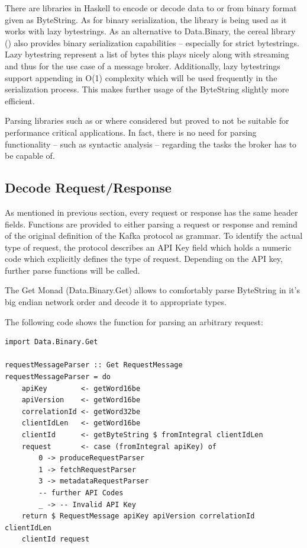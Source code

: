 There are libraries in Haskell to encode or decode data to or from binary
format given as ByteString. As for binary serialization, the
library is being used as it works with lazy bytestrings. As an alternative to
Data.Binary, the cereal library
()
also provides binary serialization capabilities -- especially for strict
bytestrings. Lazy bytestring represent a list of bytes this plays nicely along
with streaming and thus for the use case of a message broker. Additionally,
lazy bytestrings support appending in O(1) complexity which will be used
frequently in the serialization process. This makes further usage of the
ByteString slightly more efficient.

Parsing libraries such as
 or
 where considered but
proved to not be suitable for performance critical applications. In fact, there
is no need for parsing functionality -- such as syntactic analysis -- regarding
the tasks the broker has to be capable of. 

\subsection{Decode Request/Response}

As mentioned in previous section, every request or response has the same header
fields. Functions are provided to either parsing a request or response and
remind of the original definition of the Kafka protocol as grammar. To identify
the actual type of request, the protocol describes an API Key field which holds
a numeric code which explicitly defines the type of request. Depending on the
API key, further parse functions will be called. 

The Get Monad (Data.Binary.Get) allows to comfortably parse ByteString in
it's big endian network order and decode it to appropriate types.

The following code shows the function for parsing an arbitrary request:

\begin{lstlisting}
import Data.Binary.Get

requestMessageParser :: Get RequestMessage 
requestMessageParser = do 
    apiKey        <- getWord16be
    apiVersion    <- getWord16be
    correlationId <- getWord32be
    clientIdLen   <- getWord16be
    clientId      <- getByteString $ fromIntegral clientIdLen
    request       <- case (fromIntegral apiKey) of
        0 -> produceRequestParser
        1 -> fetchRequestParser
        3 -> metadataRequestParser
        -- further API Codes 
        _ -> -- Invalid API Key 
    return $ RequestMessage apiKey apiVersion correlationId clientIdLen
    clientId request
\end{lstlisting}

